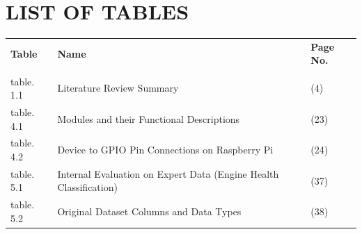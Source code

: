 \newpage

\chapter*{\centering  LIST OF TABLES}

\begin{tabular*}{\textwidth}{@{\extracolsep{\fill}}lll}
\textbf{Table} & \textbf{Name} & \textbf{Page No.} \\
\\[-0.3cm]
table. 1.1 & Literature Review Summary & (4) \\
table. 4.1 & Modules and their Functional Descriptions & (23) \\
table. 4.2 &  Device to GPIO Pin Connections on Raspberry Pi & (24) \\
table. 5.1 &  Internal Evaluation on Expert Data (Engine Health Classification) & (37) \\
table. 5.2 &  Original Dataset Columns and Data Types & (38) \\
\end{tabular*}


